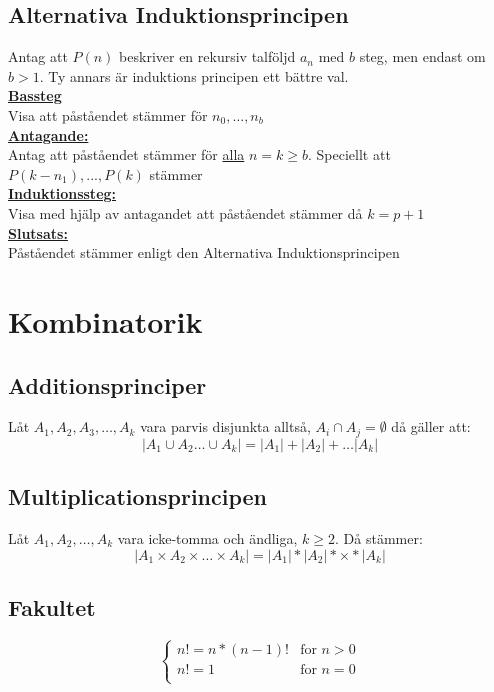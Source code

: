\documentclass{article}
\begin{document}
	\subsection{Alternativa Induktionsprincipen}
	Antag att $P(n)$ beskriver en rekursiv talföljd $a_{n}$ med $b$ steg, men endast om $b > 1$. Ty annars är induktions principen ett bättre val.\\
	\textbf{\underline{Bassteg}} \\
	Visa att påståendet stämmer för $n_{0}, \dots , n_{b}$ \\
	\textbf{\underline{Antagande:}} \\
	Antag att påståendet stämmer för \underline{alla} $n = k \geq b$. Speciellt att $P(k-n_{1}), ... , P(k)$ stämmer \\
	\textbf{\underline{Induktionssteg:}} \\
	Visa med hjälp av antagandet att påståendet stämmer då $k = p + 1$ \\
	\textbf{\underline{Slutsats:}} \\
	Påståendet stämmer enligt den Alternativa Induktionsprincipen \\

	\section{Kombinatorik}

	\subsection{Additionsprinciper}
	Låt $A_1, A_2, A_3, \dots ,A_k$ vara parvis disjunkta alltså, $A_i \cap A_j = \emptyset$ då gäller att:
	$$
		|A_1 \cup A_2 \dots \cup A_k| = |A_1| + |A_2| + \dots |A_k|
	$$
	\subsection{Multiplicationsprincipen}
	Låt $A_1, A_2, \dots ,A_k$ vara icke-tomma och ändliga, $k \ge 2$. Då stämmer:
	$$
		|A_1 \times A_2 \times \dots \times A_k| = |A_1| * |A_2| * \times * |A_k|
	$$

	\subsection{Fakultet}
	$$
	\begin{cases}
		n! = n * (n - 1)! & \text{for }n > 0\\    
		n! = 1 & \text{for } n = 0\\
	\end{cases}
	$$
\end{document}
